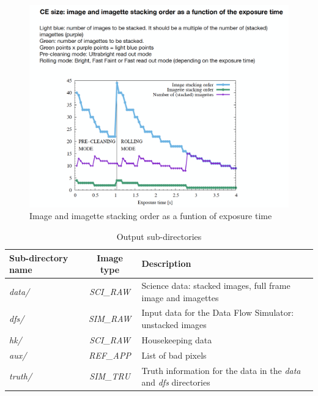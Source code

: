 \documentclass[11pt]{article}      %
\begin{document}
\begin{figure}[hbtp]
  \begin{center}
    \includegraphics[width=\textwidth]{LUT_image_stacking.png}
    \caption{Image and imagette stacking order as a funtion of exposure time}
    \label{fig:LUT_image_stacking}
  \end{center}
\end{figure}

\begin{table}[hbtp]
  \caption{Output sub-directories}
  \begin{tabular}{| l | c | l |}
    \hline  {\bf Sub-directory name} & {\bf Image type} & {\bf Description}\\
    \hline 
    {\it data/} & {\it SCI\_RAW}  &Science data: stacked images, full frame image and imagettes\\
    {\it dfs/} & {\it SIM\_RAW} & Input data for the Data Flow Simulator: unstacked images\\
    {\it hk/} & {\it SCI\_RAW} & Housekeeping data\\
    {\it aux/} & {\it REF\_APP} & List of bad pixels\\
    {\it truth/} & {\it SIM\_TRU} & Truth information for the data in the {\it data} and {\it dfs} directories\\
    \hline 
  \end{tabular}
  \label{tab:subdirs}
\end{table}
\end{document}
